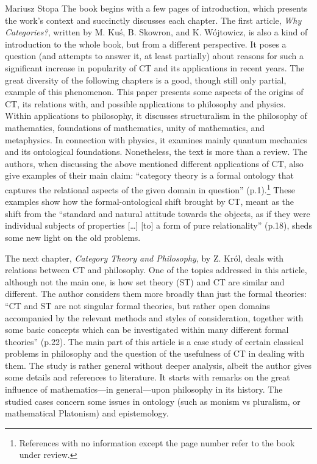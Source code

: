 \begin{recengenv}{Mariusz Stopa}
The book begins with a few pages of introduction, which presents the work's context and succinctly discusses each chapter. The first article, \textit{Why Cat\-e\-gories?}, written by M. Kuś, B. Skowron, and K. Wójtowicz, is also a kind of introduction to the whole book, but from a different perspective. It poses a question (and attempts to answer it, at least partially) about reasons for such a significant increase in popularity of CT and its applications in recent years. The great diversity of the following chapters is a good, though still only partial, example of this phenomenon. This paper presents some aspects of the origins of CT, its relations with, and possible applications to philosophy and physics. Within applications to philosophy, it discusses structuralism in the philosophy of mathematics, foundations of mathematics, unity of mathematics, and metaphysics. In connection with physics, it examines mainly quantum mechanics and its ontological foundations. Nonetheless, the text is more than a review. The authors, when discussing the above mentioned different applications of CT, also give examples of their main claim: ``cat\-e\-go\-ry theory is a formal ontology that captures the relational aspects of the given domain in question'' (p.1).\footnote{References with no information except the page number refer to the book under review.} These examples show how the formal-ontological shift brought by CT, meant as the shift from the ``standard and natural attitude towards the objects, as if they were individual subjects of properties [\ldots] [to] a form of pure relationality'' (p.18), sheds some new light on the old problems.


The next chapter, \textit{Category Theory and Philosophy}, by Z. Król, deals with relations between CT and philosophy. One of the topics addressed in this article, although not the main one, is how set theory (ST) and CT are similar and different. The author considers them more broadly than just the formal theories: ``CT and ST are not singular formal theories, but rather open domains accompanied by the relevant methods and styles of consideration, together with some basic concepts which can be investigated within many different formal theories'' (p.22). The main part of this article is a case study of certain classical problems in philosophy and the question of the usefulness of CT in dealing with them. The study is rather general without deeper analysis, albeit the author gives some details and references to literature. It starts with remarks on the great influence of mathematics---in general---upon philosophy in its history. The studied cases concern some issues in ontology (such as monism vs pluralism, or mathematical Platonism) and epistemology.


\end{recengenv}
